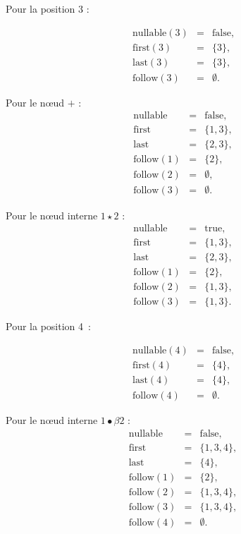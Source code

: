 Pour la position 3 : 

$$\begin{array}{lcl}
\mbox{nullable}(3)&=&\mbox{false},\\
\mbox{first}(3)&=&\{3\},\\
\mbox{last}(3)&=&\{3\},\\
\mbox{follow}(3)&=&\emptyset.
\end{array}
$$

Pour le n\oe{}ud $+$ : 
$$\begin{array}{lcl}
\mbox{nullable}&=&\mbox{false},\\
\mbox{first}&=&\{1,3\},\\
\mbox{last}&=&\{2,3\},\\
\mbox{follow}(1)&=&\{2\},\\
\mbox{follow}(2)&=&\emptyset,\\
\mbox{follow}(3)&=&\emptyset.
\end{array}
$$

Pour le n\oe{}ud interne $1\star2$ : 
$$\begin{array}{lcl}
\mbox{nullable}&=&\mbox{true},\\
\mbox{first}&=&\{1,3\},\\
\mbox{last}&=&\{2,3\},\\
\mbox{follow}(1)&=&\{2\},\\
\mbox{follow}(2)&=&\{1,3\},\\
\mbox{follow}(3)&=&\{1,3\}.
\end{array}
$$

Pour la position 4~: 

$$\begin{array}{lcl}
\mbox{nullable}(4)&=&\mbox{false},\\
\mbox{first}(4)&=&\{4\},\\
\mbox{last}(4)&=&\{4\},\\
\mbox{follow}(4)&=&\emptyset.
\end{array}
$$

Pour le n\oe{}ud interne $1\bullet \beta2$ : 
$$\begin{array}{lcl}
\mbox{nullable}&=&\mbox{false},\\
\mbox{first}&=&\{1,3,4\},\\
\mbox{last}&=&\{4\},\\
\mbox{follow}(1)&=&\{2\},\\
\mbox{follow}(2)&=&\{1,3,4\},\\
\mbox{follow}(3)&=&\{1,3,4\},\\
\mbox{follow}(4)&=&\emptyset.
\end{array}
$$

